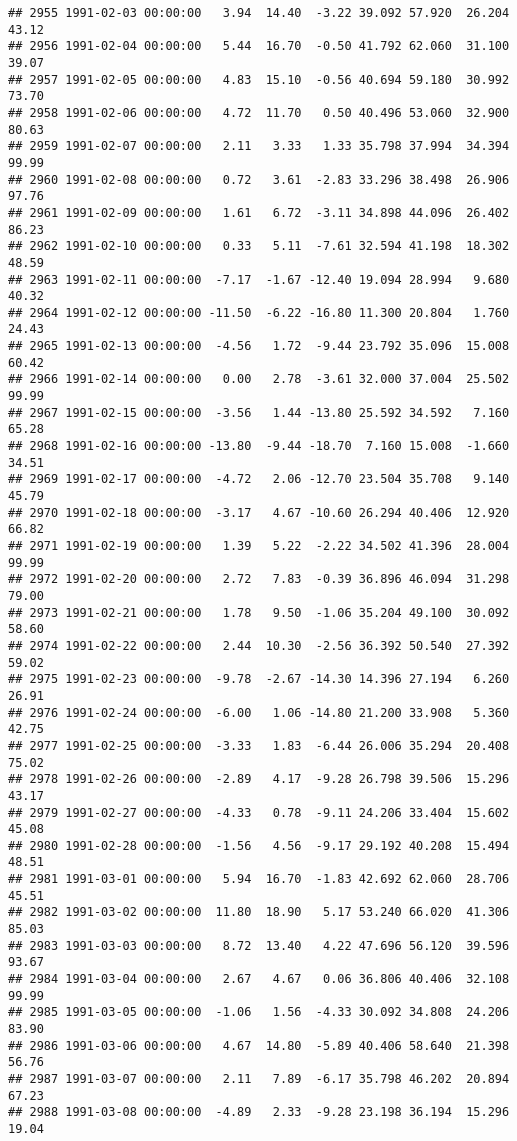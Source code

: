 \documentclass{article}\usepackage{graphicx, color}
\makeatletter
\newenvironment{kframe}{%
 \def\at@end@of@kframe{}%
 \ifinner\ifhmode%
  \def\at@end@of@kframe{\end{minipage}}%
  \begin{minipage}{\columnwidth}%
 \fi\fi%
 \def\FrameCommand##1{\hskip\@totalleftmargin \hskip-\fboxsep
 \colorbox{shadecolor}{##1}\hskip-\fboxsep
     \hskip-\linewidth \hskip-\@totalleftmargin \hskip\columnwidth}%
 \MakeFramed {\advance\hsize-\width
   \@totalleftmargin\z@ \linewidth\hsize
   \@setminipage}}%
 {\par\unskip\endMakeFramed%
 \at@end@of@kframe}
\newenvironment{knitrout}{}{} %
\makeatother
\begin{document}
\begin{knitrout}
\begin{kframe}
\begin{verbatim}
## 2955 1991-02-03 00:00:00   3.94  14.40  -3.22 39.092 57.920  26.204  43.12
## 2956 1991-02-04 00:00:00   5.44  16.70  -0.50 41.792 62.060  31.100  39.07
## 2957 1991-02-05 00:00:00   4.83  15.10  -0.56 40.694 59.180  30.992  73.70
## 2958 1991-02-06 00:00:00   4.72  11.70   0.50 40.496 53.060  32.900  80.63
## 2959 1991-02-07 00:00:00   2.11   3.33   1.33 35.798 37.994  34.394  99.99
## 2960 1991-02-08 00:00:00   0.72   3.61  -2.83 33.296 38.498  26.906  97.76
## 2961 1991-02-09 00:00:00   1.61   6.72  -3.11 34.898 44.096  26.402  86.23
## 2962 1991-02-10 00:00:00   0.33   5.11  -7.61 32.594 41.198  18.302  48.59
## 2963 1991-02-11 00:00:00  -7.17  -1.67 -12.40 19.094 28.994   9.680  40.32
## 2964 1991-02-12 00:00:00 -11.50  -6.22 -16.80 11.300 20.804   1.760  24.43
## 2965 1991-02-13 00:00:00  -4.56   1.72  -9.44 23.792 35.096  15.008  60.42
## 2966 1991-02-14 00:00:00   0.00   2.78  -3.61 32.000 37.004  25.502  99.99
## 2967 1991-02-15 00:00:00  -3.56   1.44 -13.80 25.592 34.592   7.160  65.28
## 2968 1991-02-16 00:00:00 -13.80  -9.44 -18.70  7.160 15.008  -1.660  34.51
## 2969 1991-02-17 00:00:00  -4.72   2.06 -12.70 23.504 35.708   9.140  45.79
## 2970 1991-02-18 00:00:00  -3.17   4.67 -10.60 26.294 40.406  12.920  66.82
## 2971 1991-02-19 00:00:00   1.39   5.22  -2.22 34.502 41.396  28.004  99.99
## 2972 1991-02-20 00:00:00   2.72   7.83  -0.39 36.896 46.094  31.298  79.00
## 2973 1991-02-21 00:00:00   1.78   9.50  -1.06 35.204 49.100  30.092  58.60
## 2974 1991-02-22 00:00:00   2.44  10.30  -2.56 36.392 50.540  27.392  59.02
## 2975 1991-02-23 00:00:00  -9.78  -2.67 -14.30 14.396 27.194   6.260  26.91
## 2976 1991-02-24 00:00:00  -6.00   1.06 -14.80 21.200 33.908   5.360  42.75
## 2977 1991-02-25 00:00:00  -3.33   1.83  -6.44 26.006 35.294  20.408  75.02
## 2978 1991-02-26 00:00:00  -2.89   4.17  -9.28 26.798 39.506  15.296  43.17
## 2979 1991-02-27 00:00:00  -4.33   0.78  -9.11 24.206 33.404  15.602  45.08
## 2980 1991-02-28 00:00:00  -1.56   4.56  -9.17 29.192 40.208  15.494  48.51
## 2981 1991-03-01 00:00:00   5.94  16.70  -1.83 42.692 62.060  28.706  45.51
## 2982 1991-03-02 00:00:00  11.80  18.90   5.17 53.240 66.020  41.306  85.03
## 2983 1991-03-03 00:00:00   8.72  13.40   4.22 47.696 56.120  39.596  93.67
## 2984 1991-03-04 00:00:00   2.67   4.67   0.06 36.806 40.406  32.108  99.99
## 2985 1991-03-05 00:00:00  -1.06   1.56  -4.33 30.092 34.808  24.206  83.90
## 2986 1991-03-06 00:00:00   4.67  14.80  -5.89 40.406 58.640  21.398  56.76
## 2987 1991-03-07 00:00:00   2.11   7.89  -6.17 35.798 46.202  20.894  67.23
## 2988 1991-03-08 00:00:00  -4.89   2.33  -9.28 23.198 36.194  15.296  19.04

\end{verbatim}
\end{kframe}
\end{knitrout}
\end{document}
